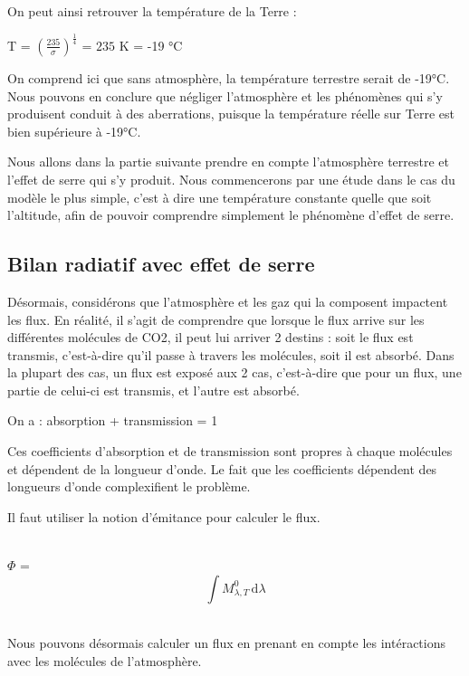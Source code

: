 \documentclass[a4paper, 12pt]{report} %
\begin{document}
On peut ainsi retrouver la température de la Terre :
\begin{center}
T = $(\frac{235}{\sigma})^{\frac{1}{4}}$ = $235$ K = -19 °C
\end{center} \vspace{\baselineskip}

On comprend ici que sans atmosphère, la température terrestre
serait de -19°C. Nous pouvons en conclure que négliger l'atmosphère et les phénomènes qui s'y produisent
conduit à des aberrations, puisque la température réelle
sur Terre est bien supérieure à -19°C.

Nous allons dans la partie suivante prendre en compte l'atmosphère terrestre et l'effet de serre qui s'y produit. Nous commencerons par une étude dans le cas du modèle le plus simple, c'est à dire une température constante quelle que soit l'altitude, afin de pouvoir comprendre simplement le phénomène d'effet de serre.


\subsection{Bilan radiatif avec effet de serre}

Désormais, considérons que l’atmosphère et les gaz qui la composent impactent les flux. En réalité, il s’agit de comprendre que lorsque le flux arrive sur les différentes molécules de CO2, il peut lui arriver 2 destins : soit le flux est transmis, c’est-à-dire qu’il passe à travers les molécules, soit il est absorbé. Dans la plupart des cas, un flux est exposé aux 2 cas, c’est-à-dire que pour un flux, une partie de celui-ci est transmis, et l’autre est absorbé.

On a :  absorption + transmission = 1

Ces coefficients d'absorption et de transmission sont propres à chaque molécules et dépendent de la longueur d’onde. Le fait que les coefficients dépendent des longueurs d’onde complexifient le problème. 

Il faut utiliser la notion d'émitance pour calculer le flux.  

\begin{center}\\
	$\Phi$ =\[ \int M^0_{\lambda,T} \, \mathrm{d}\lambda \]
   \end{center}\\

Nous pouvons désormais calculer un flux en prenant en compte les intéractions avec les molécules de l’atmosphère.
\end{document}
